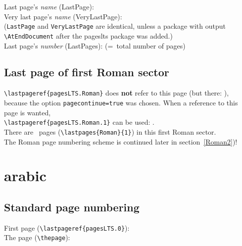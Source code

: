 \documentclass[british]{article}
\begin{document}
\noindent Last page's \textit{name} (LastPage): \\

\noindent Very last page's \textit{name} (VeryLastPage): \\
(\texttt{LastPage} and \texttt{VeryLastPage} are identical, unless
a package with output \linebreak
\verb|\AtEndDocument| after the \textsf{pageslts} package was added.)\\

\noindent Last page's \textit{number} (LastPages): 
(=~total number of pages)\\

\lipsum[1-4]

\newpage

\subsection{Last page of first Roman sector}
\verb|\lastpageref{pagesLTS.Roman}| does \textbf{not}
refer to this page (but there: ),
because the option \texttt{pagecontinue=true}
was chosen. When a reference to this page is wanted,\\
\verb|\lastpageref{pagesLTS.Roman.1}| can be used: .\\

\bigskip
There are ~pages (\verb|\lastpages{Roman}{1}|)
in this first Roman sector.\\
The Roman page numbering scheme is continued later in section~\ref{Roman2})!

\newpage


\section{arabic}

\subsection{Standard page numbering}

\noindent First page (\verb|\lastpageref{pagesLTS.0}|):
\\

\noindent The page (\verb|\thepage|): \thepage \\
\end{document}
